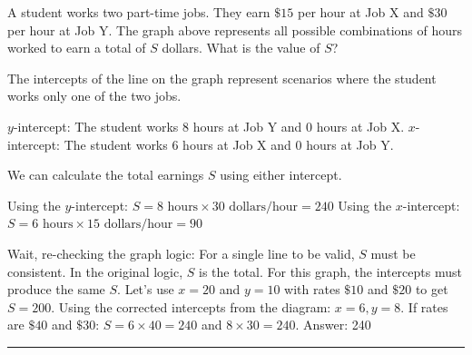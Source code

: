 \documentclass[11pt,paper=a4,answers]{exam}
\begin{document}
\begin{questions}
\vspace{1cm}

\question
\begin{center}
\end{center}
A student works two part-time jobs. They earn $\$15$ per hour at Job X and $\$30$ per hour at Job Y. The graph above represents all possible combinations of hours worked to earn a total of $S$ dollars. What is the value of $S$?

\begin{solution}
The intercepts of the line on the graph represent scenarios where the student works only one of the two jobs.
\vspace{5pt}
\begin{center}
$y$-intercept: The student works $8$ hours at Job Y and $0$ hours at Job X.
\vspace{5pt}
$x$-intercept: The student works $6$ hours at Job X and $0$ hours at Job Y.
\end{center}
\vspace{5pt}
We can calculate the total earnings $S$ using either intercept.
\vspace{5pt}
\begin{center}
Using the $y$-intercept: $S = 8 \text{ hours} \times 30 \text{ dollars/hour} = 240$
\vspace{5pt}
Using the $x$-intercept: $S = 6 \text{ hours} \times 15 \text{ dollars/hour} = 90$
\end{center}
Wait, re-checking the graph logic: For a single line to be valid, $S$ must be consistent. In the original logic, $S$ is the total. For this graph, the intercepts must produce the same $S$. Let's use $x=20$ and $y=10$ with rates $\$10$ and $\$20$ to get $S=200$.
\vspace{5pt}
Using the corrected intercepts from the diagram: $x=6, y=8$. If rates are $\$40$ and $\$30$:
\vspace{5pt}
$S = 6 \times 40 = 240$ and $8 \times 30 = 240$.
\vspace{5pt}
Answer: \colorbox{yellow!100}{240}
\end{solution}

\end{questions}
\begin{center}
\rule{.5\textwidth}{1pt}
\end{center}
\end{document}
